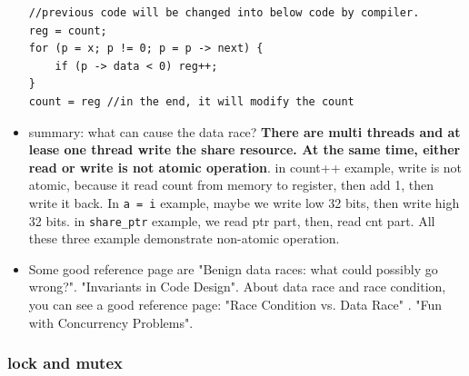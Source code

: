 \documentclass[a4paper,11pt,twoside]{book}
\begin{document}
\begin{itemize}
\begin{lstlisting}[]
//previous code will be changed into below code by compiler.
reg = count;
for (p = x; p != 0; p = p -> next) {
    if (p -> data < 0) reg++;
}
count = reg //in the end, it will modify the count
\end{lstlisting}


    \item summary: what can cause the data race? \textbf{There are multi threads and at lease one thread write the share resource. At the same time,  either read or write is not atomic operation}. in count++ example, write is not atomic, because it read count from memory to register, then add 1, then write it back. In \texttt{a = i} example, maybe we write low 32 bits, then write high 32 bits. in \texttt{share\_ptr} example, we read ptr part, then, read cnt part. All these three example demonstrate non-atomic operation.  
    
    \item  Some good reference page are "Benign data races: what could possibly go wrong?". "Invariants in Code Design". About data race and race condition, you can see a good reference page: "Race Condition vs. Data Race" . "Fun with Concurrency Problems".
        
\end{itemize}


\subsubsection{lock and mutex}
\end{document}
